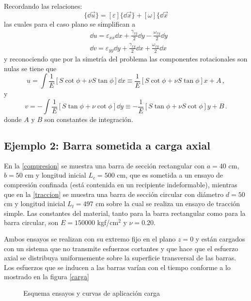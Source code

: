 \documentclass[../notas medios.tex]{subfiles}
\begin{document}
Recordando las relaciones:
\[\{ \dd{\vec u} \} = [\varepsilon] \{ \dd{\vec x}\} + [\omega] \{\dd{\vec x}\]
las cuales para el caso plano se simplifican a
\begin{align*}
&\dd{u} = \varepsilon_{xx}\dd{x} + \frac{\gamma_{xy}}{2}\dd{y} - 
\frac{\omega_{xy}}{2}\dd{y}\\
&\dd{v} = \varepsilon_{yy}\dd{y} + \frac{\gamma_{xy}}{2}\dd{x} + 
\frac{\omega_{xy}}{2}\dd{x}
\end{align*}
y reconociendo que por la simetría del problema las componentes rotacionales son nulas se tiene que
\[u = \int \frac{1}{E}[S \cot\phi  + \nu S \tan\phi]\dd{x}  \equiv 
\frac{1}{E}[S \cot\phi  + \nu S \tan\phi]x + A\, ,\]
y
\[v =  - \int \frac{1}{E}[S \tan\phi  + \nu \cot\phi]\dd{y}  \equiv  - 
\frac{1}{E}[S \tan\phi  + \nu S \cot\phi]y + B\, .\]
donde $A$ y $B$ son constantes de integración.


\subsection*{Ejemplo 2: Barra sometida a carga axial}

En la \cref{compresion} se muestra una barra de sección rectangular con $a= 40$ cm, $b = 50$ cm y longitud inicial $L_{c} = 500$ cm, que es  sometida a un ensayo de compresión confinada (está contenida en un recipiente indeformable), mientras que en la \cref{traccion}  se muestra una barra de sección circular con diámetro $d = 50$ cm y longitud inicial $L_{t} = 497$ cm sobre la cual se realiza  un ensayo de tracción simple. Las constantes del material, tanto para la barra rectangular como para la barra circular, son $E=150000$ kgf/cm$^2$ y $\nu=0.20$.

Ambos ensayos se realizan con su extremo fijo  en el plano $z = 0$ y están cargados con un sistema que no transmite esfuerzos cortantes y que hace que el esfuerzo axial se distribuya uniformemente sobre la superficie transversal de las barras. Los esfuerzos que se inducen a las barras varían con el tiempo conforme a lo mostrado en la figura \cref{carga}
\begin{figure}[H]
	\centering
	\hspace{0.5cm}
		\hspace{0.5cm}
	\caption{Esquema ensayos y curvas de aplicación carga}
	\label{ensayo}
\end{figure}
\end{document}
